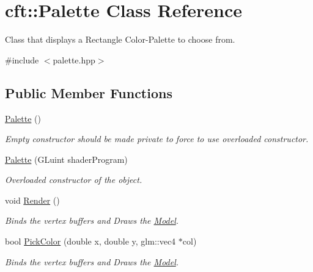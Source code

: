 \hypertarget{classcft_1_1Palette}{}\section{cft\+:\+:Palette Class Reference}
\label{classcft_1_1Palette}


Class that displays a Rectangle Color-\/\+Palette to choose from.  




{\ttfamily \#include $<$palette.\+hpp$>$}

\subsection*{Public Member Functions}
\begin{DoxyCompactItemize}
\item 
\hyperlink{classcft_1_1Palette_aad50af355716e9be3c297c8c9ebc1d3a}{Palette} ()\hypertarget{classcft_1_1Palette_aad50af355716e9be3c297c8c9ebc1d3a}{}\label{classcft_1_1Palette_aad50af355716e9be3c297c8c9ebc1d3a}

\begin{DoxyCompactList}\small\item\em Empty constructor should be made private to force to use overloaded constructor. \end{DoxyCompactList}\item 
\hyperlink{classcft_1_1Palette_a065411dc110b5ee0f82348fef6170b2d}{Palette} (G\+Luint shader\+Program)
\begin{DoxyCompactList}\small\item\em Overloaded constructor of the object. \end{DoxyCompactList}\item 
void \hyperlink{classcft_1_1Palette_af2f48d937d0994f4c52817bf74d95148}{Render} ()\hypertarget{classcft_1_1Palette_af2f48d937d0994f4c52817bf74d95148}{}\label{classcft_1_1Palette_af2f48d937d0994f4c52817bf74d95148}

\begin{DoxyCompactList}\small\item\em Binds the vertex buffers and Draws the \hyperlink{classcft_1_1Model}{Model}. \end{DoxyCompactList}\item 
bool \hyperlink{classcft_1_1Palette_a0678d1dec043a41ca06e16bf71172b62}{Pick\+Color} (double x, double y, glm\+::vec4 $\ast$col)
\begin{DoxyCompactList}\small\item\em Binds the vertex buffers and Draws the \hyperlink{classcft_1_1Model}{Model}. \end{DoxyCompactList}\end{DoxyCompactItemize}
